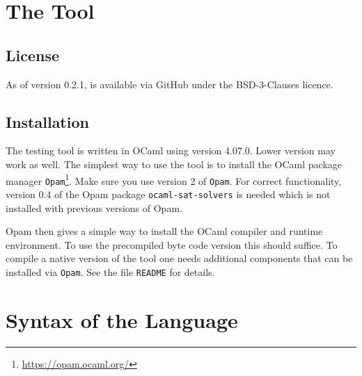 \documentclass[twoside]{article}
\begin{document}
\appendix

\section{The \DiMo Tool}

\subsection{License}
As of version 0.2.1, \DiMo is available via GitHub under the BSD-3-Clauses licence.


\subsection{Installation}

The \DiMo testing tool is written in OCaml using version 4.07.0. Lower version may work as well. The simplest way to use the tool is to install the OCaml package manager 
\texttt{Opam}\footnote{\url{https://opam.ocaml.org/}}. Make sure you use version 2 of \texttt{Opam}. For correct functionality, version 0.4 of the Opam package 
\texttt{ocaml-sat-solvers} is needed which is not installed with previous versions of Opam.

Opam then gives a simple way to install the OCaml compiler and runtime environment. To use the precompiled byte code version this should suffice. To compile a native 
version of the \DiMo tool one needs additional components that can be installed via \texttt{Opam}. See the file \texttt{README} for details.

\section{Syntax of the \DiMo Language}
\end{document}

